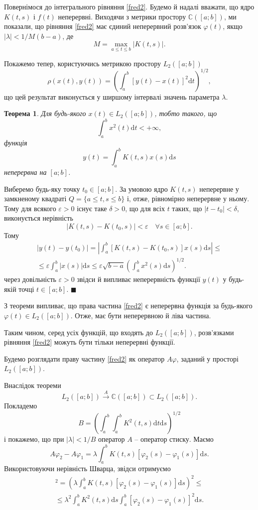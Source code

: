 \documentclass[14pt,twoside]{extreport}
\theoremstyle{mystyle}
\newtheorem{thm}{Теорема}
\renewenvironment{proof}{{\bfseries Доведення.}}{$\blacksquare$}
\numberwithin{equation}{chapter}
\newcommand{\cab}{\mathbb{C}([a; b])}
\begin{document}
Повернімося до інтегрального рівняння \eqref{fred2}. Будемо й надалі вважати, що ядро $K(t, s)$ і $f(t)$ неперервні. Виходячи з метрики простору $\cab$, ми показали, що рівняння \eqref{fred2} має єдиний неперервний розв'язок $\varphi(t)$, якщо $|\lambda| < 1/M(b - a)$, де
\[
 M = \max\limits_{a \leqslant t \leqslant b} |K(t, s)|.
\]

Покажемо тепер, користуючись метрикою простору $L_2([a; b])$
\[
 \rho (x(t), y(t)) = \left(\int_{a}^{b} [y(t) - x(t)]^2 \mathrm{d}t\right)^{1/2},
\]
що цей результат виконується у ширшому інтервалі значень параметра $\lambda$.

\begin{thm}\label{l2cont}
Для будь-якого $x(t) \in L_2 ([a; b])$, тобто такого, що
\[
 \int_{a}^{b} x^2(t) \mathrm{d}t < +\infty,
\]
функція
\[
y(t) = \int_{a}^{b} K(t, s) x(s) \mathrm{d}s
\]
неперервна на $[a; b]$.
\end{thm}

\begin{proof}
Виберемо будь-яку точку $t_0 \in [a; b]$. За умовою ядро $K(t, s)$ неперервне у замкненому квадраті $Q = \{a \leqslant t, s \leqslant b\}$ і, отже, рівномірно неперервне у ньому. Тому для всякого $\varepsilon > 0$ існує таке $\delta > 0$, що для всіх $t$ таких, що $|t - t_0| < \delta$, виконується нерівність
\[
 |K(t, s) - K(t_0, s)| < \varepsilon \quad \forall s \in [a; b].
\]
Тому
\begin{multline*}
 |y(t) - y(t_0)| = \left|\int_{a}^{b} [ K(t, s) - K(t_0, s)] x(s) \mathrm{d}s\right|\leqslant\\
\leqslant \varepsilon \int_{a}^{b} |x(s)|\mathrm{d}s \leqslant \varepsilon \sqrt{b - a} \left(\int_{a}^{b} x^2(s) \mathrm{d}s\right)^{1/2}.
\end{multline*}
через довільність $\varepsilon > 0$ звідси й випливає неперервність функції $y(t)$ у будь-якій точці $t\in [a; b]$.
\end{proof}

З теореми випливає, що права частина \eqref{fred2} є неперервна функція за будь-якого $\varphi(t) \in L_2([a; b])$. Отже, має бути неперервною й ліва частина.

Таким чином, серед усіх функцій, що входять до $L_2([a; b])$, розв'язками рівняння \eqref{fred2} можуть бути тільки неперервні функції.

Будемо розглядати праву частину \eqref{fred2} як оператор $A\varphi$, заданий у просторі $L_2([a; b])$.

Внаслідок теореми
\[
 L_2([a; b]) \xrightarrow{A} \cab \subset L_2([a; b]).
\]
Покладемо
\[
 B = \left(\int_{a}^{b} \int_{a}^{b} K^2(t,s) \mathrm{d}t \mathrm{d}s\right)^{1/2}
\]
і покажемо, що при $|\lambda| < 1/B$ оператор $A$ -- оператор стиску. Маємо
\[
A\varphi_2 - A\varphi_1 = \lambda \int_{a}^{b} K(t, s) [\varphi_2(s) - \varphi_1(s)] \mathrm{d}s.
\]
Використовуючи нерівність Шварца, звідси отримуємо
\begin{multline*}
 [A\varphi_2 - A\varphi_1]^2 = \left(\lambda \int_{a}^{b} K(t, s) [\varphi_2(s) - \varphi_1(s)] \mathrm{d}s\right)^2 \leqslant\\
 \leqslant \lambda^2 \int_{a}^{b} K^2(t, s) \mathrm{d}s \int_{a}^{b}[\varphi_2(s) - \varphi_1(s)]^2 \mathrm{d}s.
\end{multline*}
\end{document}

